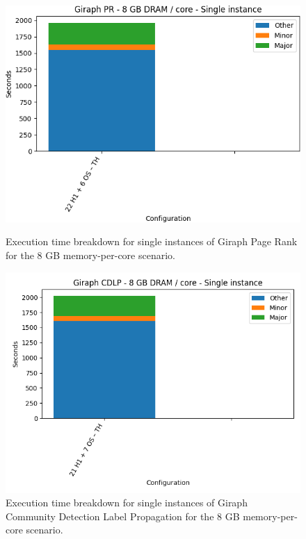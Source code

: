 \begin{figure}[thbp]
        \centering
    \includegraphics[width=\linewidth]{./fig/g_pr64_single.png}
    \caption{Execution time breakdown for single instances of Giraph
	Page Rank for the 8 GB memory-per-core scenario.}
    \label{fig:g_pr64_single}
    \includegraphics[width=\linewidth]{./fig/g_cdlp64_single.png}
    \caption{Execution time breakdown for single instances of Giraph
    Community Detection Label Propagation for the 8 GB memory-per-core scenario.}
    \label{fig:g_cdlp64_single}
\end{figure}


